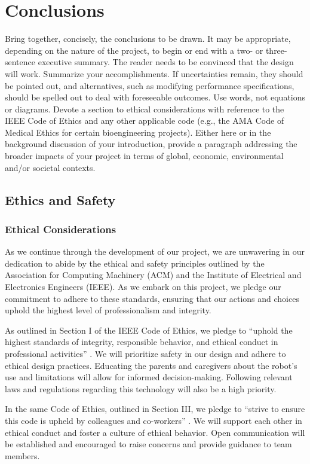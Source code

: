 \documentclass{report}
\begin{document}
    \chapter{Conclusions}

    Bring together, concisely, the conclusions to be drawn. It may be appropriate, depending on the nature of the project, to begin or end with a two- or three-sentence executive summary. The reader needs to be convinced that the design will work. Summarize your accomplishments. If uncertainties remain, they should be pointed out, and alternatives, such as modifying performance specifications, should be spelled out to deal with foreseeable outcomes. Use words, not equations or diagrams. Devote a section to ethical considerations with reference to the IEEE Code of Ethics and any other applicable code (e.g., the AMA Code of Medical Ethics for certain bioengineering projects). Either here or in the background discussion of your introduction, provide a paragraph addressing the broader impacts of your project in terms of global, economic, environmental and/or societal contexts.

    \section{Ethics and Safety}
    \subsection{Ethical Considerations}
    As we continue through the development of our project, we are unwavering in our dedication to abide by the ethical and safety principles outlined by the Association for Computing Machinery (ACM) and the Institute of Electrical and Electronics Engineers (IEEE). As we embark on this project, we pledge our commitment to adhere to these standards, ensuring that our actions and choices uphold the highest level of professionalism and integrity.

    As outlined in Section I of the IEEE Code of Ethics, we pledge to “uphold the highest standards of integrity, responsible behavior, and ethical conduct in professional activities” \cite{IEEE_2020}. We will prioritize safety in our design and adhere to ethical design practices. Educating the parents and caregivers about the robot’s use and limitations will allow for informed decision-making. Following relevant laws and regulations regarding this technology will also be a high priority.

    In the same Code of Ethics, outlined in Section III, we pledge to “strive to ensure this code is upheld by colleagues and co-workers” \cite{IEEE_2020}. We will support each other in ethical conduct and foster a culture of ethical behavior. Open communication will be established and encouraged to raise concerns and provide guidance to team members.
\end{document}
